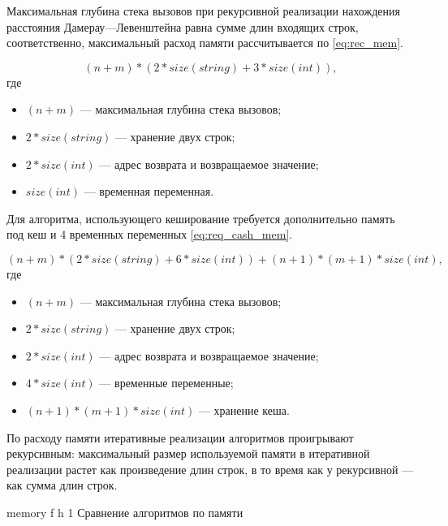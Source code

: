 Максимальная глубина стека вызовов при рекурсивной реализации
нахождения расстояния Дамерау---Левенштейна равна сумме длин входящих строк,
соответственно, максимальный расход памяти рассчитывается по \eqref{eq:rec_mem}.

\begin{equation}
	\label{eq:rec_mem}
	(n + m) * (2 * size(string) + 3 * size(int)),
\end{equation}
где 
\begin{itemize}
	\item $ (n + m) $ --- максимальная глубина стека вызовов;
	\item $ 2 * size(string) $ --- хранение двух строк;
	\item $ 2 * size(int) $ --- адрес возврата и возвращаемое значение;
	\item $ size(int) $ --- временная переменная.
\end{itemize}

Для алгоритма, использующего кеширование требуется дополнительно память под кеш и 4 временных переменных \eqref{eq:req_cash_mem}.

\begin{equation}
	\label{eq:req_cash_mem}
	(n + m) * (2 * size(string) + 6 * size(int)) + (n + 1) * (m + 1) * size(int),
\end{equation}
где 
\begin{itemize}
	\item $ (n + m) $ --- максимальная глубина стека вызовов;
	\item $ 2 * size(string) $ --- хранение двух строк;
	\item $ 2 * size(int) $ --- адрес возврата и возвращаемое значение;
	\item $ 4 * size(int) $ --- временные переменные;
	\item $ (n + 1) * (m + 1) * size(int) $ --- хранение кеша.
\end{itemize}

По расходу памяти итеративные реализации алгоритмов проигрывают рекурсивным: максимальный размер используемой памяти в итеративной реализации растет
как произведение длин строк, в то время как у рекурсивной ---
как сумма длин строк.

{memory} %
{f} %
{h} %
{1\textwidth} %
{Сравнение алгоритмов по памяти} %

